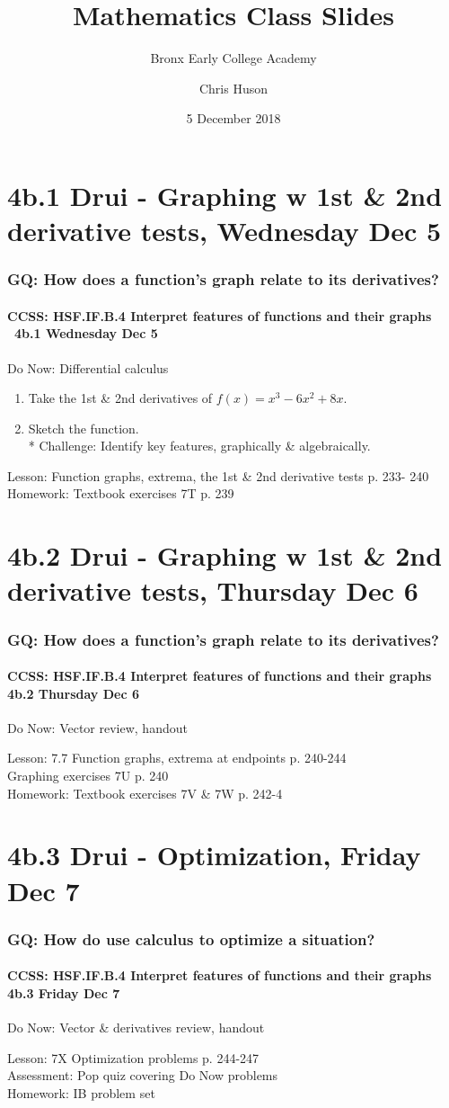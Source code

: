 \documentclass{beamer}
\title{Mathematics Class Slides}
\subtitle{Bronx Early College Academy}
\author{Chris Huson}
\date{5 December 2018}
\begin{document}
\frame{\titlepage}


\section{4b.1 Drui - Graphing w 1st \& 2nd derivative tests, Wednesday Dec 5}
  \frame
  {\frametitle{GQ: How does a function's graph relate to its derivatives?}
    \framesubtitle{CCSS: HSF.IF.B.4 Interpret features of functions and their graphs \  \alert{4b.1 Wednesday Dec 5}}

    \begin{block}{Do Now: Differential calculus}
    \begin{enumerate}
        \item Take the 1st \& 2nd derivatives of $f(x)=x^3-6x^2+8x$.
        \item Sketch the function.\\*
        Challenge: Identify key features, graphically \& algebraically.
    \end{enumerate}
    \end{block}
    Lesson: Function graphs, extrema, the 1st \& 2nd derivative tests p. 233- 240\\ \bigskip
    Homework: Textbook exercises 7T p. 239
  }

\section{4b.2 Drui - Graphing w 1st \& 2nd derivative tests, Thursday Dec 6}
  \frame
  {\frametitle{GQ: How does a function's graph relate to its derivatives?}
    \framesubtitle{CCSS: HSF.IF.B.4 Interpret features of functions and their graphs \quad \alert{4b.2 Thursday Dec 6}}

    \begin{block}{Do Now: Vector review, handout}
    \end{block}
    Lesson: 7.7 Function graphs, extrema at endpoints p. 240-244\\
    Graphing exercises 7U p. 240\\ \bigskip
    Homework: Textbook exercises 7V \& 7W p. 242-4
  }

\section{4b.3 Drui - Optimization, Friday Dec 7}
  \frame
  {\frametitle{GQ: How do use calculus to optimize a situation?}
    \framesubtitle{CCSS: HSF.IF.B.4 Interpret features of functions and their graphs \quad \alert{4b.3  Friday Dec 7}}

    \begin{block}{Do Now: Vector \& derivatives review, handout}
    \end{block}
    Lesson: 7X Optimization problems p. 244-247\\ \bigskip
    Assessment: Pop quiz covering Do Now problems\\ \bigskip
    Homework: IB problem set
  }
\end{document}
